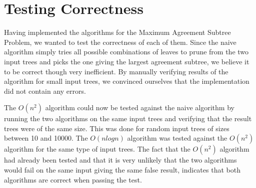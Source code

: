 \chapter{Testing Correctness}
Having implemented the algorithms for the Maximum Agreement Subtree Problem, we wanted to test the correctness of each of them. Since the naive algorithm simply tries all possible combinations of leaves to prune from the two input trees and picks the one giving the largest agreement subtree, we believe it to be correct though very inefficient. By manually verifying results of the algorithm for small input trees, we convinced ourselves that the implementation did not contain any errors.

The $O(n^2)$ algorithm could now be tested against the naive algorithm by running the two algorithms on the same input trees and verifying that the result trees were of the same size. This was done for random input trees of sizes between 10 and 10000. The $O(nlogn)$ algorithm was tested against the $O(n^2)$ algorithm for the same type of input trees. The fact that the $O(n^2)$ algorithm had already been tested and that it is very unlikely that the two algorithms would fail on the same input giving the same false result, indicates that both algorithms are correct when passing the test.